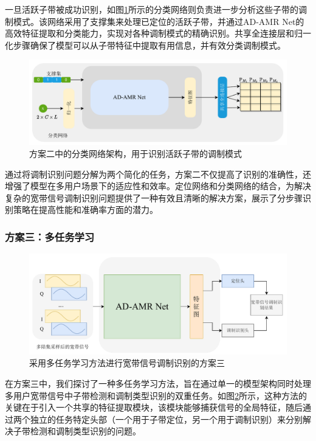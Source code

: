 一旦活跃子带被成功识别，如图\ref{fig:planb_classification}所示的分类网络则负责进一步分析这些子带的调制模式。该网络采用了支撑集来处理已定位的活跃子带，并通过AD-AMR Net的高效特征提取和分类能力，实现对各种调制模式的精确识别。共享全连接层和归一化步骤确保了模型可以从子带特征中提取有用信息，并有效分类调制模式。

\begin{figure}
    \centering
    \includegraphics[width=\textwidth]{Image/classification_cn.pdf}
    \caption{方案二中的分类网络架构，用于识别活跃子带的调制模式}
    \label{fig:planb_classification}
\end{figure}

通过将调制识别问题分解为两个简化的任务，方案二不仅提高了识别的准确性，还增强了模型在多用户场景下的适应性和效率。定位网络和分类网络的结合，为解决复杂的宽带信号调制识别问题提供了一种有效且清晰的解决方案，展示了分步骤识别策略在提高性能和准确率方面的潜力。
\subsubsection{方案三：多任务学习}\label{sec:background}

\begin{figure}
    \centering
    \includegraphics[width=\textwidth]{Image/planc.pdf}
    \caption{采用多任务学习方法进行宽带信号调制识别的方案三}
    \label{fig:planc}
\end{figure}
在方案三中，我们探讨了一种多任务学习方法，旨在通过单一的模型架构同时处理多用户宽带信号中子带检测和调制类型识别的双重任务。如图\ref{fig:planc}所示，这种方法的关键在于引入一个共享的特征提取模块，该模块能够捕获信号的全局特征，随后通过两个独立的任务特定头部（一个用于子带定位，另一个用于调制识别）来分别解决子带检测和调制类型识别的问题。


